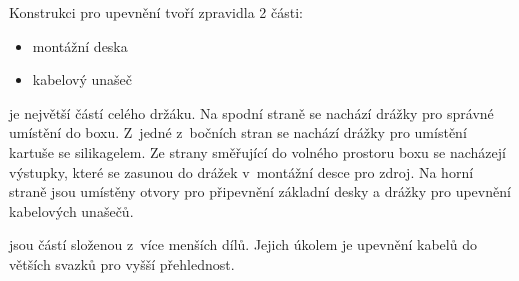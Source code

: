 Konstrukci pro upevnění tvoří zpravidla 2 části:
\begin{itemize}
    \item montážní deska
    \item kabelový unašeč
\end{itemize}

\noindent{} je největší částí celého držáku. 
Na spodní straně se nachází drážky pro správné umístění do boxu.
Z~jedné z~bočních stran se nachází drážky pro umístění kartuše se silikagelem.
Ze strany směřující do volného prostoru boxu se nacházejí výstupky, které se zasunou do drážek v~montážní desce pro zdroj.
Na horní straně jsou umístěny otvory pro připevnění základní desky a drážky pro upevnění kabelových unašečů.
\newline

\noindent{} jsou částí složenou z~více menších dílů.
Jejich úkolem je upevnění kabelů do větších svazků pro vyšší přehlednost.


\newpage